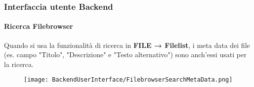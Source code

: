 \begin{frame}[fragile]
	\frametitle{Interfaccia utente Backend}
	\framesubtitle{Ricerca Filebrowser}

	Quando si usa la funzionalità di ricerca in \textbf{FILE → Filelist}, i meta data
	dei file (es. campo "Titolo", "Descrizione" e "Testo alternativo") sono anch'essi usati per
	la ricerca.

	\begin{figure}
		\texttt{[image: BackendUserInterface/FilebrowserSearchMetaData.png]}
	\end{figure}

\end{frame}

